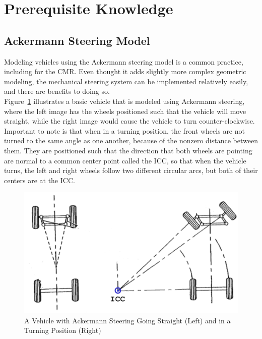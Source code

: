 \acresetall
\section{Prerequisite Knowledge}\label{traction_control:discussion:prereqs}
\subsection{Ackermann Steering Model}\label{traction_control:discussion:ackermann-steering-section}
Modeling vehicles using the Ackermann steering model is a common practice, including for the \ac{CMR}. Even thought it adds slightly more complex geometric modeling, the mechanical steering system can be implemented relatively easily, and there are benefits to doing so. \\

Figure~\ref{traction_control:discussion:ackermann-steering} illustrates a basic vehicle that is modeled using Ackermann steering, where the left image has the wheels positioned such that the vehicle will move straight, while the right image would cause the vehicle to turn counter-clockwise. Important to note is that when in a turning position, the front wheels are not turned to the same angle as one another, because of the nonzero distance between them. They are positioned such that the direction that both wheels are pointing are normal to a common center point called the \ac{ICC}, so that when the vehicle turns, the left and right wheels follow two different circular arcs, but both of their centers are at the \ac{ICC}.

\begin{figure}[H]
	\centering
	\includegraphics[width=.8\textwidth]{sections/discussion/images/ackermann_steering.png}
	\caption{A Vehicle with Ackermann Steering Going Straight (Left) and in a Turning Position (Right)}
	\label{traction_control:discussion:ackermann-steering}
\end{figure}

